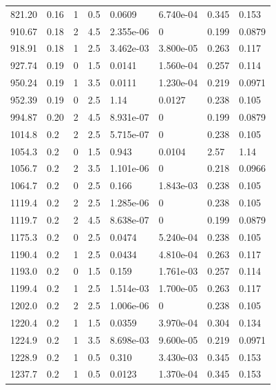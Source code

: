 \documentclass[preview]{standalone}
\begin{document}
{{{\begin{tabular}{L{1.2cm}C{1.2cm} C{0.3cm}C{0.5cm} C{1.4cm}C{1.4cm} C{1.4cm}C{1.4cm}}
  821.20  &  0.16  & 1     & 0.5 &  0.0609  & 6.740e-04  & 0.345 &  0.153   \\ 
  910.67  &  0.18  & 2     & 4.5 &  2.355e-06  & 0  & 0.199 &  0.0879   \\ 
  918.91  &  0.18  & 1     & 2.5 &  3.462e-03  & 3.800e-05  & 0.263 &  0.117   \\ 
  927.74  &  0.19  & 0     & 1.5 &  0.0141  & 1.560e-04  & 0.257 &  0.114   \\ 
  950.24  &  0.19  & 1     & 3.5 &  0.0111  & 1.230e-04  & 0.219 &  0.0971   \\ 
  952.39  &  0.19  & 0     & 2.5 &  1.14  & 0.0127  & 0.238 &  0.105   \\ 
  994.87  &  0.20  & 2     & 4.5 &  8.931e-07  & 0  & 0.199 &  0.0879   \\ 
  1014.8  &   0.2  & 2     & 2.5 &  5.715e-07  & 0  & 0.238 &  0.105   \\ 
  1054.3  &   0.2  & 0     & 1.5 &  0.943  & 0.0104  & 2.57 &  1.14   \\ 
  1056.7  &   0.2  & 2     & 3.5 &  1.101e-06  & 0  & 0.218 &  0.0966   \\ 
  1064.7  &   0.2  & 0     & 2.5 &  0.166  & 1.843e-03  & 0.238 &  0.105   \\ 
  1119.4  &   0.2  & 2     & 2.5 &  1.285e-06  & 0  & 0.238 &  0.105   \\ 
  1119.7  &   0.2  & 2     & 4.5 &  8.638e-07  & 0  & 0.199 &  0.0879   \\ 
  1175.3  &   0.2  & 0     & 2.5 &  0.0474  & 5.240e-04  & 0.238 &  0.105   \\ 
  1190.4  &   0.2  & 1     & 2.5 &  0.0434  & 4.810e-04  & 0.263 &  0.117   \\ 
  1193.0  &   0.2  & 0     & 1.5 &  0.159  & 1.761e-03  & 0.257 &  0.114   \\ 
  1199.4  &   0.2  & 1     & 2.5 &  1.514e-03  & 1.700e-05  & 0.263 &  0.117   \\ 
  1202.0  &   0.2  & 2     & 2.5 &  1.006e-06  & 0  & 0.238 &  0.105   \\ 
  1220.4  &   0.2  & 1     & 1.5 &  0.0359  & 3.970e-04  & 0.304 &  0.134   \\ 
  1224.9  &   0.2  & 1     & 3.5 &  8.698e-03  & 9.600e-05  & 0.219 &  0.0971   \\ 
  1228.9  &   0.2  & 1     & 0.5 &  0.310  & 3.430e-03  & 0.345 &  0.153   \\ 
  1237.7  &   0.2  & 1     & 0.5 &  0.0123  & 1.370e-04  & 0.345 &  0.153   \\ 

\end{tabular}}}}
\end{document}
